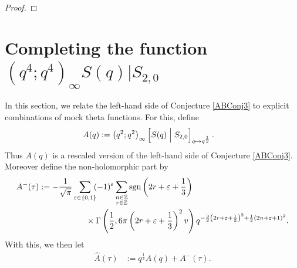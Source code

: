 \documentclass[12pt,reqno]{amsart}
\renewcommand{\r}{{\rho}}
\renewcommand{\t}{\tau}
\renewcommand{\(}{\left\(}
\renewcommand{\)}{\right\)}
\numberwithin{equation}{section}
\theoremstyle{plain}
\theoremstyle{definition}
\numberwithin{equation}{section}
\begin{document}
\begin{proof}
\end{proof}

\section{Completing the function $(q^4;q^4)_{\infty}S(q)|S_{2,0}$}\label{sec3}



In this section, we relate the left-hand side of Conjecture \ref{ABConj3} to explicit combinations of mock theta functions. For this, define 
\begin{align*}%
A(q)&:=\left(q^2;q^2\right)_{\infty}\left[S(q)\Bigm|S_{2,0}\right]_{q\mapsto q^{\frac 12}}.
\end{align*}
Thus $A(q)$ is a rescaled version of the left-hand side of Conjecture \ref{ABConj3}. Moreover define the non-holomorphic part by
\begin{align*} 
A^{-}(\t)&:=-\frac{1}{\sqrt{\pi}}\sum_{\varepsilon\in\{0,1\}}\!\!(-1)^{\varepsilon}\sum_{\substack{n\in \mathbb{Z}\\r\in \mathbb{Z}}}\text{sgn}\left(2r+\varepsilon+\frac 13\right)\\%
&\hspace{2 cm}\times\Gamma\left(\frac 12,6\pi\left(2r+\varepsilon+\frac 13\right)^2v\right)q^{-\frac 32\left(2r+\varepsilon+\frac 13\right)^2+\frac 12\left(2n+\varepsilon+1\right)^2}.
\end{align*}
With this, we then let
\begin{align*}
\widehat{A}(\t)&:=q^{\frac 13}A\!\left(q\right)+A^{-}(\t).
\end{align*} 
 
\end{document}
